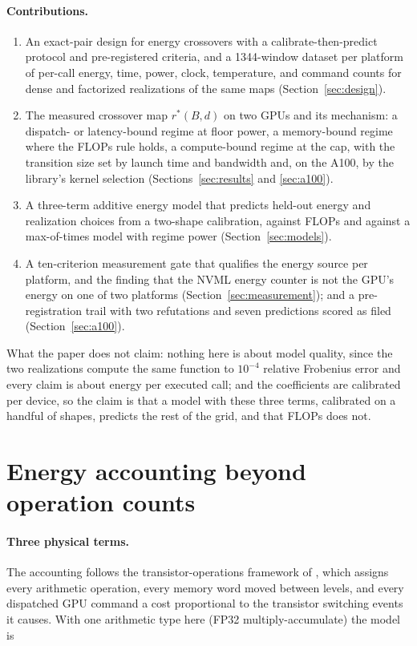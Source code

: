 \documentclass{article}
\newcommand{\rstar}{r^{*}}
\begin{document}
\paragraph{Contributions.}
\begin{enumerate}
\item An exact-pair design for energy crossovers with a calibrate-then-predict protocol and pre-registered criteria, and a 1344-window dataset per platform of per-call energy, time, power, clock, temperature, and command counts for dense and factorized realizations of the same maps (Section~\ref{sec:design}).
\item The measured crossover map $\rstar(B, d)$ on two GPUs and its mechanism: a dispatch- or latency-bound regime at floor power, a memory-bound regime where the FLOPs rule holds, a compute-bound regime at the cap, with the transition size set by launch time and bandwidth and, on the A100, by the library's kernel selection (Sections~\ref{sec:results} and \ref{sec:a100}).
\item A three-term additive energy model that predicts held-out energy and realization choices from a two-shape calibration, against FLOPs and against a max-of-times model with regime power (Section~\ref{sec:models}).
\item A ten-criterion measurement gate that qualifies the energy source per platform, and the finding that the NVML energy counter is not the GPU's energy on one of two platforms (Section~\ref{sec:measurement}); and a pre-registration trail with two refutations and seven predictions scored as filed (Section~\ref{sec:a100}).
\end{enumerate}

What the paper does not claim: nothing here is about model quality, since the two realizations compute the same function to $10^{-4}$ relative Frobenius error and every claim is about energy per executed call; and the coefficients are calibrated per device, so the claim is that a model with these three terms, calibrated on a handful of shapes, predicts the rest of the grid, and that FLOPs does not.

\section{Energy accounting beyond operation counts}
\label{sec:background}

\paragraph{Three physical terms.} The accounting follows the transistor-operations framework of \citet{syed2026toml}, which assigns every arithmetic operation, every memory word moved between levels, and every dispatched GPU command a cost proportional to the transistor switching events it causes. With one arithmetic type here (FP32 multiply-accumulate) the model is
\end{document}
